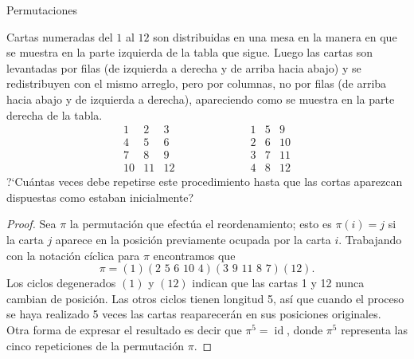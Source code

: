 \begin{section}{Permutaciones}
\begin{ejemplo}\label{cartas} Cartas numeradas del $1$ al $12$ son distribuidas en una mesa en la manera en que se muestra en la parte izquierda de la tabla que sigue. Luego las cartas son levantadas  por filas (de izquierda a derecha y de arriba hacia abajo) y se redistribuyen con el mismo arreglo, pero por columnas, no por filas (de arriba hacia abajo y de izquierda a derecha), apareciendo como se muestra en la parte derecha de la tabla.
$$
\begin{matrix} 1& 2& 3\\
4 &5 &6 \\
7 &8 & 9\\
10 &11 & 12 \end{matrix}\qquad \qquad\qquad
\begin{matrix}1 &5 &9 \\
2 &6 &10 \\
3& 7& 11\\
4&8 & 12 \end{matrix}
$$
?`Cuántas veces debe repetirse este procedimiento hasta que las cortas aparezcan dispuestas como estaban inicialmente?
\end{ejemplo}
\begin{proof} Sea $\pi$ la permutación que efectúa el reordenamiento; esto es $\pi(i) =j$ si la carta $j$ aparece en la posición previamente ocupada por la carta $i$. Trabajando con la notación cíclica para $\pi$ encontramos que
$$
\pi=(1)(2\,\,5\,\,6\,\,10\,\,4)(3\,\,9\,\,11\,\,8\,\,7)(12).
$$
Los ciclos degenerados $(1)$ y $(12)$ indican que las cartas 1 y 12 nunca cambian de posición. Las otros ciclos tienen longitud 5, así que cuando el proceso se haya realizado 5 veces las cartas
reaparecerán en sus posiciones originales. Otra forma de expresar el resultado es decir que $\pi^5= \operatorname{id}$, donde $\pi^5$ representa las cinco repeticiones de la permutación $\pi$.
\end{proof}
\end{section}


